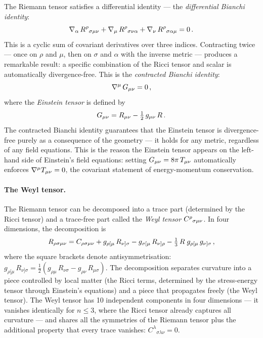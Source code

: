 The Riemann tensor satisfies a differential identity --- the
\emph{differential Bianchi identity}:
%
\begin{equation}
  \nabla_{\alpha}\, R^{\rho}{}_{\sigma \mu \nu}
  + \nabla_{\mu}\, R^{\rho}{}_{\sigma \nu \alpha}
  + \nabla_{\nu}\, R^{\rho}{}_{\sigma \alpha \mu} = 0 \,.
  \label{eq:bianchi-differential}
\end{equation}
%
This is a cyclic sum of covariant derivatives over three indices.  Contracting
twice --- once on $\rho$ and $\mu$, then on $\sigma$ and $\alpha$ with the
inverse metric --- produces a remarkable result: a specific combination of the
Ricci tensor and scalar is automatically divergence-free.  This is the
\emph{contracted Bianchi identity}:
%
\begin{equation}
  \nabla^\mu\, G_{\mu\nu} = 0 \,,
  \label{eq:contracted-bianchi}
\end{equation}
%
where the \emph{Einstein tensor} is defined by
%
\begin{equation}
  G_{\mu\nu} = R_{\mu\nu} - \tfrac{1}{2}\,g_{\mu\nu}\,R \,.
  \label{eq:einstein-tensor}
\end{equation}
%
The contracted Bianchi identity guarantees that the Einstein tensor is
divergence-free purely as a consequence of the geometry --- it holds for any
metric, regardless of any field equations.  This is the reason the Einstein
tensor appears on the left-hand side of Einstein's field equations:
setting $G_{\mu\nu} = 8\pi\,T_{\mu\nu}$ automatically
enforces $\nabla^\mu T_{\mu\nu} = 0$, the covariant statement of
energy-momentum conservation.

\paragraph{The Weyl tensor.}

The Riemann tensor can be decomposed into a trace part (determined by the Ricci
tensor) and a trace-free part called the \emph{Weyl tensor}
$C^{\rho}{}_{\sigma \mu \nu}$.  In four dimensions, the decomposition is
%
\begin{equation}
  R_{\rho\sigma\mu\nu}
    = C_{\rho\sigma\mu\nu}
    + g_{\rho[\mu}\,R_{\nu]\sigma}
    - g_{\sigma[\mu}\,R_{\nu]\rho}
    - \tfrac{1}{3}\,R\;
      g_{\rho[\mu}\,g_{\nu]\sigma} \,,
  \label{eq:weyl-decomposition}
\end{equation}
%
where the square brackets denote antisymmetrisation:
$g_{\rho[\mu}\,R_{\nu]\sigma} = \tfrac{1}{2}(g_{\rho\mu}\,R_{\nu\sigma}
- g_{\rho\nu}\,R_{\mu\sigma})$.  The decomposition separates curvature into a
piece controlled by local matter (the Ricci terms, determined by the
stress-energy tensor through Einstein's equations) and a piece that propagates
freely (the Weyl tensor).  The Weyl tensor has 10 independent components in
four dimensions --- it vanishes identically for $n \leq 3$, where the Ricci
tensor already captures all curvature --- and shares all the symmetries of the
Riemann tensor plus the
additional property that every trace vanishes:
$C^\lambda{}_{\sigma\lambda\nu} = 0$.

